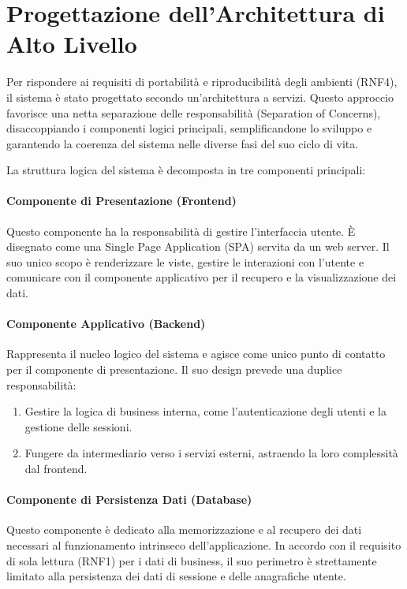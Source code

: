 \documentclass[12pt,a4paper,openright,twoside]{book}
\begin{document}
\section{Progettazione dell'Architettura di Alto Livello}
\label{sec:design_architettura}

Per rispondere ai requisiti di portabilità e riproducibilità degli ambienti (RNF4), il sistema è stato progettato secondo un'architettura a servizi. Questo approccio favorisce una netta separazione delle responsabilità (Separation of Concerns), disaccoppiando i componenti logici principali, semplificandone lo sviluppo e garantendo la coerenza del sistema nelle diverse fasi del suo ciclo di vita.

La struttura logica del sistema è decomposta in tre componenti principali:


\paragraph{Componente di Presentazione (Frontend)} Questo componente ha la responsabilità di gestire l'interfaccia utente. È disegnato come una Single Page Application (SPA) servita da un web server. Il suo unico scopo è renderizzare le viste, gestire le interazioni con l'utente e comunicare con il componente applicativo per il recupero e la visualizzazione dei dati.

\paragraph{Componente Applicativo (Backend)} Rappresenta il nucleo logico del sistema e agisce come unico punto di contatto per il componente di presentazione. Il suo design prevede una duplice responsabilità:
\begin{enumerate}
    \item Gestire la logica di business interna, come l'autenticazione degli utenti e la gestione delle sessioni.
    \item Fungere da intermediario verso i servizi esterni, astraendo la loro complessità dal frontend.
\end{enumerate}

\paragraph{Componente di Persistenza Dati (Database)} Questo componente è dedicato alla memorizzazione e al recupero dei dati necessari al funzionamento intrinseco dell'applicazione. In accordo con il requisito di sola lettura (RNF1) per i dati di business, il suo perimetro è strettamente limitato alla persistenza dei dati di sessione e delle anagrafiche utente.
\end{document}
